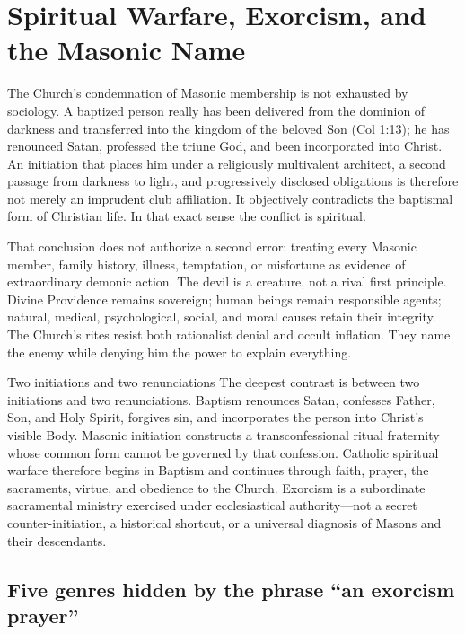 \section{Spiritual Warfare, Exorcism, and the Masonic Name}

The Church's condemnation of Masonic membership is not exhausted by sociology.  A baptized person really has been delivered from the dominion of darkness and transferred into the kingdom of the beloved Son (Col 1:13); he has renounced Satan, professed the triune God, and been incorporated into Christ.  An initiation that places him under a religiously multivalent architect, a second passage from darkness to light, and progressively disclosed obligations is therefore not merely an imprudent club affiliation.  It objectively contradicts the baptismal form of Christian life.  In that exact sense the conflict is spiritual.

That conclusion does not authorize a second error: treating every Masonic member, family history, illness, temptation, or misfortune as evidence of extraordinary demonic action.  The devil is a creature, not a rival first principle.  Divine Providence remains sovereign; human beings remain responsible agents; natural, medical, psychological, social, and moral causes retain their integrity.  The Church's rites resist both rationalist denial and occult inflation.  They name the enemy while denying him the power to explain everything.

\begin{massbox}{Two initiations and two renunciations}
The deepest contrast is between two initiations and two renunciations.  Baptism renounces Satan, confesses Father, Son, and Holy Spirit, forgives sin, and incorporates the person into Christ's visible Body.  Masonic initiation constructs a transconfessional ritual fraternity whose common form cannot be governed by that confession.  Catholic spiritual warfare therefore begins in Baptism and continues through faith, prayer, the sacraments, virtue, and obedience to the Church.  Exorcism is a subordinate sacramental ministry exercised under ecclesiastical authority---not a secret counter-initiation, a historical shortcut, or a universal diagnosis of Masons and their descendants.
\end{massbox}

\subsection{Five genres hidden by the phrase ``an exorcism prayer''}

